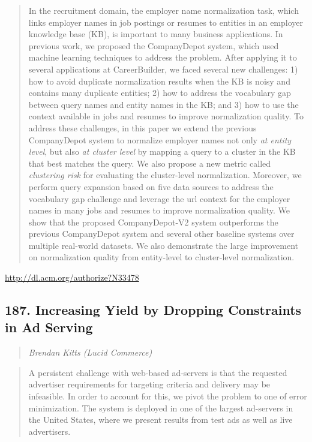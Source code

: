 \documentclass{article}
\begin{document}
\begin{quote}
In the recruitment domain, the employer name normalization task, which links employer names in job postings or resumes to entities in an employer knowledge base (KB), is important to many business applications. In previous work, we proposed the CompanyDepot system, which used machine learning techniques to address the problem. After applying it to several applications at CareerBuilder, we faced several new challenges: 1) how to avoid duplicate normalization results when the KB is noisy and contains many duplicate entities; 2) how to address the vocabulary gap between query names and entity names in the KB; and 3) how to use the context available in jobs and resumes to improve normalization quality. To address these challenges, in this paper we extend the previous CompanyDepot system to normalize employer names not only \textit{at entity level}, but also \textit{at cluster level} by mapping a query to a cluster in the KB that best matches the query. We also propose a new metric called \textit{clustering risk} for evaluating the cluster-level normalization. Moreover, we perform query expansion based on five data sources to address the vocabulary gap challenge and leverage the url context for the employer names in many jobs and resumes to improve normalization quality. We show that the proposed CompanyDepot-V2 system outperforms the previous CompanyDepot system and several other baseline systems over multiple real-world datasets. We also demonstrate the large improvement on normalization quality from entity-level to cluster-level normalization.
\end{quote}

\href{http://dl.acm.org/authorize?N33478}{http://dl.acm.org/authorize?N33478}

\subsection{187. Increasing Yield by Dropping Constraints in Ad Serving}

\begin{quote}
\footnotesize{\textit{Brendan Kitts (Lucid Commerce)}}

\end{quote}

\begin{quote}
A persistent challenge with web-based ad-servers is that the requested advertiser requirements for targeting criteria and delivery may be infeasible. In order to account for this, we pivot the problem to one of error minimization. The system is deployed in one of the largest ad-servers in the United States, where we present results from test ads as well as live advertisers.
\end{quote}
\end{document}
